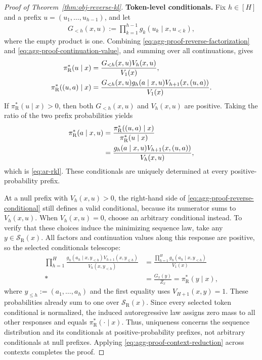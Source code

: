 \documentclass[11pt]{article}
\newcommand{\pir}{\pi_{\mathrm{R}}}
\begin{document}
\begin{proof}[Proof of Theorem~\ref{thm:obj-reverse-kl}]
\textbf{Token-level conditionals.}
Fix $h\in[H]$ and a prefix $u=(u_1,\ldots,u_{h-1})$, and let
\begin{align*}
    G_{<h}(x,u):=\prod_{k=1}^{h-1}g_k(u_k\mid x,u_{<k}),
\end{align*}
where the empty product is one. Combining
\eqref{eq:agg-proof-reverse-factorization} and
\eqref{eq:agg-proof-continuation-value}, and summing over all
continuations, gives
\begin{align}
    \pir^*(u\mid x)
    &=\frac{G_{<h}(x,u)V_h(x,u)}{V_1(x)},\notag\\*
    \pir^*((u,a)\mid x)
    &=\frac{G_{<h}(x,u)g_h(a\mid x,u)
      V_{h+1}(x,(u,a))}{V_1(x)}.
    \label{eq:agg-proof-reverse-prefix}
\end{align}
If $\pir^*(u\mid x)>0$, then both $G_{<h}(x,u)$ and
$V_h(x,u)$ are positive. Taking the ratio of the two
prefix probabilities yields
\begin{align}
    \pir^*(a\mid x,u)
    &=\frac{\pir^*((u,a)\mid x)}{\pir^*(u\mid x)}\notag\\*
    &=\frac{g_h(a\mid x,u)V_{h+1}(x,(u,a))}{V_h(x,u)},
    \label{eq:agg-proof-reverse-conditional}
\end{align}
which is \eqref{eq:ar-rkl}. These conditionals are uniquely
determined at every positive-probability prefix.

At a null prefix with $V_h(x,u)>0$, the right-hand side of
\eqref{eq:agg-proof-reverse-conditional} still defines a valid
conditional, because its numerator sums to $V_h(x,u)$.
When $V_h(x,u)=0$, choose an arbitrary conditional instead.
To verify that these choices induce the minimizing sequence
law, take any $y\in\mathcal S_{\mathrm R}(x)$. All factors
and continuation values along this response are positive,
so the selected conditionals telescope:
\begin{align*}
    \prod_{h=1}^H
    \frac{g_h(a_h\mid x,y_{<h})V_{h+1}(x,y_{\leq h})}
         {V_h(x,y_{<h})}
    &=\frac{\prod_{h=1}^H g_h(a_h\mid x,y_{<h})}{V_1(x)}\\*
    &=\frac{G_x(y)}{Z_x}
    =\pir^*(y\mid x),
\end{align*}
where $y_{\leq h}:=(a_1,\ldots,a_h)$ and the first equality
uses $V_{H+1}(x,y)=1$.
These probabilities already sum to one over
$\mathcal S_{\mathrm R}(x)$. Since every selected token
conditional is normalized, the induced autoregressive law
assigns zero mass to all other responses and equals
$\pir^*(\cdot\mid x)$.
Thus, uniqueness concerns the sequence distribution and its
conditionals at positive-probability prefixes, not arbitrary
conditionals at null prefixes. Applying
\eqref{eq:agg-proof-context-reduction} across contexts completes
the proof.
\end{proof}
\end{document}
